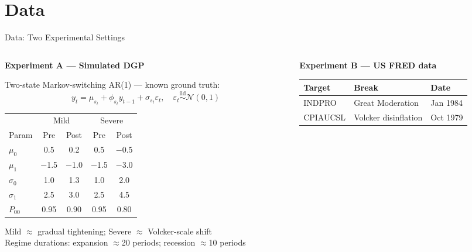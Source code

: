\documentclass[aspectratio=169, 10pt]{beamer}
\begin{document}
\section{Data}

\begin{frame}{Data: Two Experimental Settings}

  \begin{columns}[T]
    \begin{column}{0.5\textwidth}
      \textbf{Experiment A — Simulated DGP}

      Two-state Markov-switching AR(1) — known ground truth:
      \[
        y_t = \mu_{s_t} + \phi_{s_t} y_{t-1} + \sigma_{s_t}\varepsilon_t, \quad \varepsilon_t \overset{\text{iid}}{\sim}\mathcal{N}(0,1)
      \]

      \vspace{-2pt}
      \begin{center}\scriptsize
      \begin{tabular}{lcccc}
        \toprule
        & \multicolumn{2}{c}{Mild} & \multicolumn{2}{c}{Severe} \\
        \cmidrule(lr){2-3}\cmidrule(lr){4-5}
        Param & Pre & Post & Pre & Post \\
        \midrule
        $\mu_0$ & 0.5 & 0.2 & 0.5 & $-$0.5 \\
        $\mu_1$ & $-$1.5 & $-$1.0 & $-$1.5 & $-$3.0 \\
        $\sigma_0$ & 1.0 & 1.3 & 1.0 & 2.0 \\
        $\sigma_1$ & 2.5 & 3.0 & 2.5 & 4.5 \\
        $P_{00}$ & 0.95 & 0.90 & 0.95 & 0.80 \\
        \bottomrule
      \end{tabular}
      \end{center}
      {\scriptsize Mild $\approx$ gradual tightening; Severe $\approx$ Volcker-scale shift}\\[4pt]
      {\scriptsize Regime durations: expansion $\approx$20 periods; recession $\approx$10 periods}
    \end{column}
    \begin{column}{0.47\textwidth}
      \textbf{Experiment B — US FRED data}

      \vspace{4pt}
      \begin{tabular}{lll}
        \toprule
        Target & Break & Date \\
        \midrule
        INDPRO & Great Moderation & Jan 1984 \\
        CPIAUCSL & Volcker disinflation & Oct 1979 \\
        \bottomrule
      \end{tabular}


\end{column}
\end{columns}
\end{frame}
\end{document}
